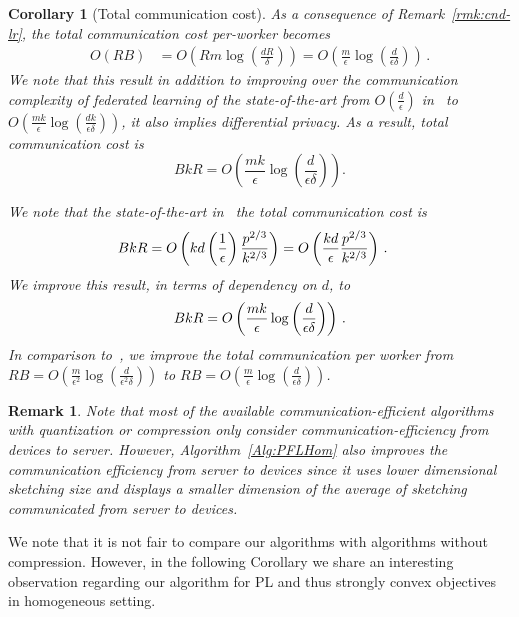 \documentclass[twoside]{article}
\newtheorem{remark}{Remark}
\newtheorem{corollary}{Corollary}
\begin{document}
\begin{corollary}[Total communication cost]
As a consequence of Remark~\ref{rmk:cnd-lr}, the total communication cost per-worker becomes \begin{align}
O\left(RB\right)&=O\left(Rm\log \left(\frac{d R}{\delta}\right)\right)=O\left(\frac{m }{\epsilon}\log \left(\frac{d }{\epsilon\delta}\right)\right) \, .
\end{align}
We note that this result in addition to improving over the communication complexity of federated learning of the state-of-the-art from $O\left(\frac{d}{\epsilon}\right)$ in~\cite{karimireddy2019scaffold,wang2018cooperative,liang2019variance} to $O\left(\frac{m k}{\epsilon}\log \left(\frac{d k}{\epsilon\delta}\right)\right)$, it also implies differential privacy. As a result, total communication cost is 
$$BkR=O\left(\frac{m k}{\epsilon}\log \left(\frac{d }{\epsilon\delta}\right)\right).$$ 

We note that the state-of-the-art in~\cite{karimireddy2019scaffold} the total communication cost is 
\begin{align}\notag
    BkR&=O\left(kd\left(\frac{1}{\epsilon}\right)\frac{p^{2/3}}{k^{2/3}} \right)=O\left(\frac{kd}{\epsilon}\frac{p^{2/3}}{k^{2/3}}\right) \, .
\end{align}
We improve this result, in terms of dependency on $d$, to 
\begin{align}\notag
    BkR=O\left(\frac{m k}{\epsilon}\log \left(\frac{d }{\epsilon\delta}\right)\right) \, .
\end{align}
In comparison to~\cite{ivkin2019communication}, we improve the total communication per worker from $RB=O\left(\frac{m }{\epsilon^2}\log \left(\frac{d }{\epsilon^2\delta}\right)\right)$ to $RB=O\left(\frac{m }{\epsilon}\log \left(\frac{d }{\epsilon\delta}\right)\right)$.
\end{corollary}

\begin{remark}
Note that most of the available communication-efficient algorithms with quantization or compression only consider communication-efficiency from devices to server. However, Algorithm~\ref{Alg:PFLHom} also improves the communication efficiency from server to devices since it uses lower dimensional sketching size and displays a smaller dimension of the average of sketching communicated from server to devices. 
\end{remark}
We note that it is not fair to compare our algorithms with algorithms without compression. 
However, in the following Corollary we share an interesting observation regarding our algorithm for PL and thus strongly convex objectives in homogeneous setting. 
\end{document}
